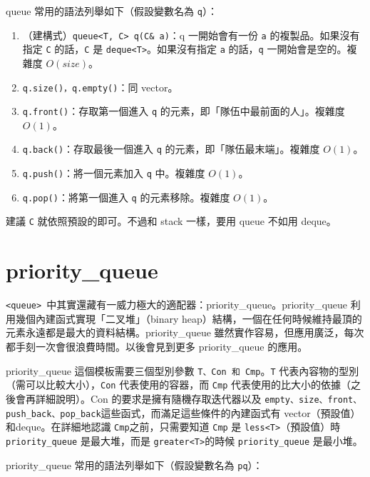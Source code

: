 \documentclass[a4paper, 11pt, oneside]{book}
\begin{document}
queue 常用的語法列舉如下（假設變數名為 \texttt{q}）：

\begin{enumerate}
    \item （建構式）\texttt{queue<T, C> q(C\& a)}：q 一開始會有一份 \texttt{a} 的複製品。如果沒有指定 \texttt{C} 的話，\texttt{C} 是 \texttt{deque<T>}。如果沒有指定 \texttt{a} 的話，\texttt{q} 一開始會是空的。複雜度 $O(size)$。
    \item \texttt{q.size()，q.empty()}：同 vector。
    \item \texttt{q.front()}：存取第一個進入 \texttt{q} 的元素，即「隊伍中最前面的人」。複雜度 $O(1)$。
    \item \texttt{q.back()}：存取最後一個進入 \texttt{q} 的元素，即「隊伍最末端」。複雜度 $O(1)$。
    \item \texttt{q.push()}：將一個元素加入 \texttt{q} 中。複雜度 $O(1)$。
    \item \texttt{q.pop()}：將第一個進入 \texttt{q} 的元素移除。複雜度 $O(1)$。
\end{enumerate}

建議 \texttt{C} 就依照預設的即可。不過和 stack 一樣，要用 queue 不如用 deque。
\section{priority\_queue}

\texttt{<queue> }中其實還藏有一威力極大的適配器：priority\_queue。priority\_queue 利用幾個內建函式實現「二叉堆」（binary heap）結構，一個在任何時候維持最頂的元素永遠都是最大的資料結構。priority\_queue 雖然實作容易，但應用廣泛，每次都手刻一次會很浪費時間。以後會見到更多 priority\_queue 的應用。

priority\_queue 這個模板需要三個型別參數 \texttt{T、Con 和 Cmp}。\texttt{T} 代表內容物的型別（需可以比較大小），\texttt{Con} 代表使用的容器，而 \texttt{Cmp} 代表使用的比大小的依據（之後會再詳細說明）。Con 的要求是擁有隨機存取迭代器以及 \texttt{empty、size、front、push\_back、pop\_back}這些函式，而滿足這些條件的內建函式有 vector（預設值）和deque。在詳細地認識 \texttt{Cmp}之前，只需要知道 \texttt{Cmp} 是 \texttt{less<T>}（預設值）時 \texttt{priority\_queue} 是最大堆，而是 \texttt{greater<T>}的時候 \texttt{priority\_queue} 是最小堆。

priority\_queue 常用的語法列舉如下（假設變數名為 \texttt{pq}）：
\end{document}
